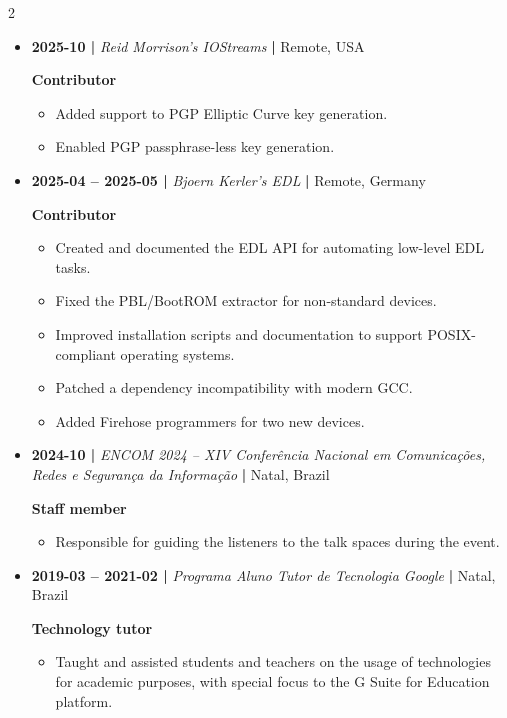 \documentclass[a4paper,10pt]{article}
\begin{document}
\begin{multicols*}{2}
\begin{itemize}
\item \textbf{2025-10 |} \emph{Reid Morrison's IOStreams} \textbf{|} Remote, USA

\textbf{Contributor}
\begin{itemize}
\item Added support to PGP Elliptic Curve key generation.

\item Enabled PGP passphrase-less key generation.
\end{itemize}

\item \textbf{2025-04 -- 2025-05 |} \emph{Bjoern Kerler's EDL} \textbf{|} Remote, Germany

\textbf{Contributor}
\begin{itemize}
\item Created and documented the EDL API for automating low-level EDL tasks.

\item Fixed the PBL/BootROM extractor for non-standard devices.

\item Improved installation scripts and documentation to support POSIX-compliant
operating systems.

\item Patched a dependency incompatibility with modern GCC.

\item Added Firehose programmers for two new devices.
\end{itemize}

\item \textbf{2024-10 |} \emph{ENCOM 2024 -- XIV Conferência Nacional em Comunicações, Redes e
Segurança da Informação} \textbf{|} Natal, Brazil

\textbf{Staff member}
\begin{itemize}
\item Responsible for guiding the listeners to the talk spaces during the event.
\end{itemize}

\item \textbf{2019-03 -- 2021-02 |} \emph{Programa Aluno Tutor de Tecnologia Google} \textbf{|} Natal,
Brazil

\textbf{Technology tutor}
\begin{itemize}
\item Taught and assisted students and teachers on the usage of technologies for
academic purposes, with special focus to the G Suite for Education platform.
\end{itemize}


\end{itemize}
\end{multicols*}
\end{document}
